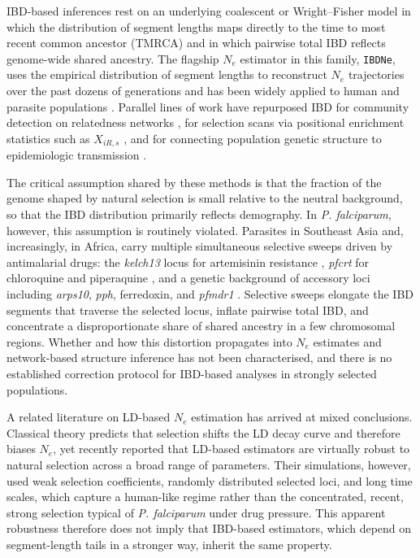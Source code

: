 \documentclass[11pt]{article}
\begin{document}
IBD-based inferences rest on an underlying coalescent or Wright--Fisher model in which the distribution of segment lengths maps directly to the time to most recent common ancestor (TMRCA) and in which pairwise total IBD reflects genome-wide shared ancestry. The flagship $N_e$ estimator in this family, \texttt{IBDNe}, uses the empirical distribution of segment lengths to reconstruct $N_e$ trajectories over the past dozens of generations and has been widely applied to human and parasite populations \citep{browning2015ibdne,daniels2015modeling}. Parallel lines of work have repurposed IBD for community detection on relatedness networks \citep{rosvall2008maps}, for selection scans via positional enrichment statistics such as $X_{iR,s}$ \citep{henden2018xirs}, and for connecting population genetic structure to epidemiologic transmission \citep{chang2019mapping,wong2017genetic}.

The critical assumption shared by these methods is that the fraction of the genome shaped by natural selection is small relative to the neutral background, so that the IBD distribution primarily reflects demography. In \textit{P. falciparum}, however, this assumption is routinely violated. Parasites in Southeast Asia and, increasingly, in Africa, carry multiple simultaneous selective sweeps driven by antimalarial drugs: the \textit{kelch13} locus for artemisinin resistance \citep{ariey2014kelch13,ashley2014tracking}, \textit{pfcrt} for chloroquine and piperaquine \citep{fidock2000pfcrt,amato2017piperaquine}, and a genetic background of accessory loci including \textit{arps10}, \textit{pph}, ferredoxin, and \textit{pfmdr1} \citep{miotto2015genetic}. Selective sweeps elongate the IBD segments that traverse the selected locus, inflate pairwise total IBD, and concentrate a disproportionate share of shared ancestry in a few chromosomal regions. Whether and how this distortion propagates into $N_e$ estimates and network-based structure inference has not been characterised, and there is no established correction protocol for IBD-based analyses in strongly selected populations.

A related literature on LD-based $N_e$ estimation has arrived at mixed conclusions. Classical theory predicts that selection shifts the LD decay curve and therefore biases $N_e$, yet \citet{novo2022ld} recently reported that LD-based estimators are virtually robust to natural selection across a broad range of parameters. Their simulations, however, used weak selection coefficients, randomly distributed selected loci, and long time scales, which capture a human-like regime rather than the concentrated, recent, strong selection typical of \textit{P. falciparum} under drug pressure. This apparent robustness therefore does not imply that IBD-based estimators, which depend on segment-length tails in a stronger way, inherit the same property.
\end{document}
